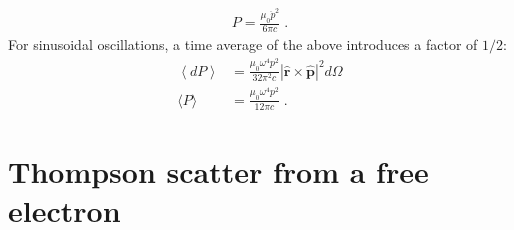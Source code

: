 \documentclass[12pt]{article}
\renewcommand{\vec}[1]{\boldsymbol{#1}}
\newcommand{\hvec}[1]{\hat{\vec{#1}}}
\newcommand{\avg}[1]{\left\langle #1 \right\rangle}
\begin{document}
\begin{align}
P =  \frac{\mu_0 \ddot{p}^2}{6\pi c}  \; .
\end{align}
For sinusoidal oscillations, a time average of the above introduces a factor of $1/2$:
\begin{align}
\avg{dP} &= \frac{\mu_0 \omega^4 p^2}{32\pi^2 c} |\hvec{r}\times\hvec{p}|^2 d\Omega \\
\langle P \rangle &=  \frac{\mu_0 \omega^4 p^2}{12\pi c} \; . \label{eqn:avgpwer}
\end{align}

\section{Thompson scatter from a free electron}
\end{document}
